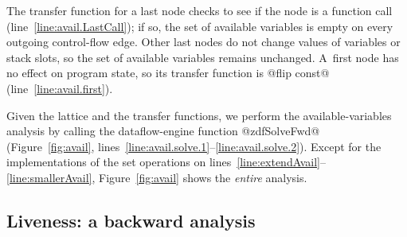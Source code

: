 \documentclass[blockstyle,preprint,natbib,nocopyrightspace]{sigplanconf}
\newcommand\lineref[1]{line~\ref{line:#1}}
\newcommand\linerangeref[2]{\mbox{lines~\ref{line:#1}--\ref{line:#2}}}
\newcommand\figref[1]{Figure~\ref{fig:#1}}
\begin{document}
The transfer function for a last node checks to see if the node is a
function call (\lineref{avail.LastCall}); if so, the set of
available variables is empty on every outgoing control-flow edge.
Other last nodes do not change values of variables or stack slots, 
so the set of available variables remains unchanged.
%
A~first node has no effect on program state, so its transfer function
is @flip const@ (\lineref{avail.first}).


Given the lattice and the transfer functions,
we perform the available-variables analysis by calling
the dataflow-engine function @zdfSolveFwd@ (\figref{avail},
\linerangeref{avail.solve.1}{avail.solve.2}). 
Except for the implementations of the set operations on
\linerangeref{extendAvail}{smallerAvail}, 
\figref{avail} shows the \emph{entire} analysis.

\subsection{Liveness: a backward analysis} 
\end{document}
